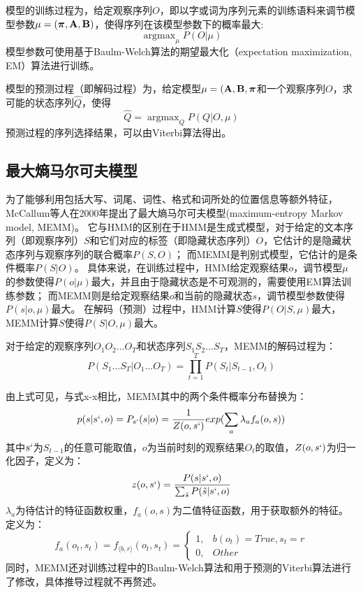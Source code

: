 模型的训练过程为，给定观察序列$O$，即以字或词为序列元素的训练语料来调节模型参数$\mu = (\boldsymbol{\mathbf{\pi}},\boldsymbol{\mathbf{A}},\boldsymbol{\mathbf{B}})$，使得序列在该模型参数下的概率最大:
\begin{equation}
    \mathop{\arg \max}_\mu P(O|\mu)
\end{equation}
模型参数可使用基于Baulm-Welch算法的期望最大化（expectation maximization, EM）算法进行训练。

模型的预测过程（即解码过程）为，给定模型$\mu = (\boldsymbol{\mathbf{A}},\boldsymbol{\mathbf{B}},\boldsymbol{\mathbf{\pi}}$和一个观察序列$O$，求可能的状态序列$\hat{Q}$，使得
\begin{equation}
    \hat{Q} = \mathop{\arg \max}_Q P(Q|O,\mu)
\end{equation}
预测过程的序列选择结果，可以由Viterbi算法得出。

\subsection{最大熵马尔可夫模型}
为了能够利用包括大写、词尾、词性、格式和词所处的位置信息等额外特征，McCallum等人在2000年提出了最大熵马尔可夫模型(maximum-entropy Markov model, MEMM)。
它与HMM的区别在于HMM是生成式模型，对于给定的文本序列（即观察序列）$S$和它们对应的标签（即隐藏状态序列）$O$，它估计的是隐藏状态序列与观察序列的联合概率$P(S,O)$；
而MEMM是判别式模型，它估计的是条件概率$P(S|O)$。
具体来说，在训练过程中，HMM给定观察结果$o$，调节模型$\mu$的参数使得$P(o|\mu)$最大，并且由于隐藏状态是不可观测的，需要使用EM算法训练参数；
而MEMM则是给定观察结果$o$和当前的隐藏状态$s$，调节模型参数使得$P(s|o,\mu)$最大。
在解码（预测）过程中，HMM计算$S$使得$P(O|S,\mu)$最大，MEMM计算$S$使得$P(S|O,\mu)$最大。

对于给定的观察序列$O_1 O_2\dots O_T$和状态序列$S_1 S_2\dots S_T$，MEMM的解码过程为：
\begin{equation}
    P(S_1\dots S_T|O_1\dots O_T) = \prod_{t=1}^{T}P(S_t|S_{t-1}, O_t)
\end{equation}

由上式可见，与式x-x相比，MEMM其中的两个条件概率分布替换为：
\begin{equation}
    p(s|s`,o) = P_{s`}(s|o) = \frac{1}{Z(o,s`)}exp(\sum_{a}\lambda_a f_a(o,s))
\end{equation}
其中$s`$为$S_{t-1}$的任意可能取值，$o$为当前时刻的观察结果$O_t$的取值，$Z(o,s`)$为归一化因子，定义为：
\begin{equation}
    z(o, s`) = \frac{P(s|s`,o)}{\sum_{\tilde{s}}P(\tilde{s}|s`,o)}
\end{equation}
$\lambda_a$为待估计的特征函数权重，$f_a(o,s)$为二值特征函数，用于获取额外的特征。定义为：
\begin{equation}
    f_a(o_t, s_t) = f_{\langle b,r\rangle}(o_t, s_t) = \left\{
        \begin{array}{lr}
        1, &b(o_t) = True, s_t = r\\
        0, &Other
        \end{array}
    \right.
\end{equation}
同时，MEMM还对训练过程中的Baulm-Welch算法和用于预测的Viterbi算法进行了修改，具体推导过程就不再赘述。

